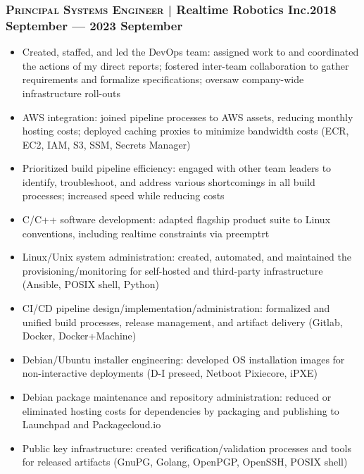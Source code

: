 \documentclass[letterpaper,10pt]{article}
\begin{document}

\subsubsection*{\textsc{Principal Systems Engineer} | Realtime Robotics Inc.\hfill 2018 September --- 2023 September}


\begin{itemize}

\item
  Created, staffed, and led the DevOps team: assigned work to and coordinated
  the actions of my direct reports; fostered inter-team collaboration to gather
  requirements and formalize specifications; oversaw company-wide
  infrastructure roll-outs
\item
  AWS integration: joined pipeline processes to AWS assets, reducing monthly
  hosting costs; deployed caching proxies to minimize bandwidth costs (ECR,
  EC2, IAM, S3, SSM, Secrets Manager)
\item
  Prioritized build pipeline efficiency: engaged with other team leaders to
  identify, troubleshoot, and address various shortcomings in all build
  processes; increased speed while reducing costs
\item
  C/C++ software development: adapted flagship product suite to Linux
  conventions, including realtime constraints via preemptrt
\item
  Linux/Unix system administration: created, automated, and maintained the
  provisioning/monitoring for self-hosted and third-party infrastructure
  (Ansible, POSIX shell, Python)
\item
  CI/CD pipeline design/implementation/administration: formalized and unified
  build processes, release management, and artifact delivery (Gitlab, Docker,
  Docker+Machine)
\item
  Debian/Ubuntu installer engineering: developed OS installation images for
  non-interactive deployments (D-I preseed, Netboot Pixiecore, iPXE)
\item
  Debian package maintenance and repository administration: reduced or
  eliminated hosting costs for dependencies by packaging and publishing to
  Launchpad and Packagecloud.io
\item
  Public key infrastructure: created verification/validation processes and
  tools for released artifacts (GnuPG, Golang, OpenPGP, OpenSSH, POSIX shell)

\end{itemize}
\end{document}
